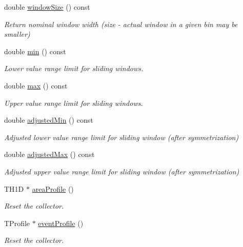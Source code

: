 \begin{DoxyCompactItemize}
double \hyperlink{classSlidingWindow_1_1Window_ae6e240862b8c40f2c965f50848f3adad}{window\+Size} () const 
\begin{DoxyCompactList}\small\item\em Return nominal window width (size -\/ actual window in a given bin may be smaller) \end{DoxyCompactList}\item 
double \hyperlink{classSlidingWindow_1_1Window_a9f134cb80a395f11025c5d0fa1465852}{min} () const 
\begin{DoxyCompactList}\small\item\em Lower value range limit for sliding windows. \end{DoxyCompactList}\item 
double \hyperlink{classSlidingWindow_1_1Window_a57ad1e073130318a845129c8d92dae4c}{max} () const 
\begin{DoxyCompactList}\small\item\em Upper value range limit for sliding windows. \end{DoxyCompactList}\item 
double \hyperlink{classSlidingWindow_1_1Window_a23fe1a632194bc586c7f9852f3e074b5}{adjusted\+Min} () const 
\begin{DoxyCompactList}\small\item\em Adjusted lower value range limit for sliding window (after symmetrization) \end{DoxyCompactList}\item 
double \hyperlink{classSlidingWindow_1_1Window_a8cfa3f86e61cfb558b71fc070a82f553}{adjusted\+Max} () const 
\begin{DoxyCompactList}\small\item\em Adjusted upper value range limit for sliding window (after symmetrization) \end{DoxyCompactList}\item 
T\+H1D $\ast$ \hyperlink{classSlidingWindow_1_1Window_a86d931b16c66ede031e568c9bf095245}{area\+Profile} ()
\begin{DoxyCompactList}\small\item\em Reset the collector. \end{DoxyCompactList}\item 
T\+Profile $\ast$ \hyperlink{classSlidingWindow_1_1Window_af4485ccec8660fad543a20b98b10d76e}{event\+Profile} ()
\begin{DoxyCompactList}\small\item\em Reset the collector. \end{DoxyCompactList}\item 

\end{DoxyCompactItemize}
